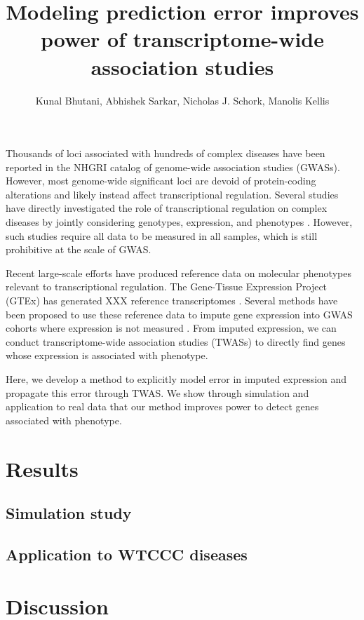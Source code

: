 \documentclass[11pt]{article}
\author{Kunal Bhutani, Abhishek Sarkar, Nicholas J. Schork, Manolis Kellis}
\date{}
\title{Modeling prediction error improves power of transcriptome-wide association studies}
\begin{document}
\maketitle
Thousands of loci associated with hundreds of complex diseases have been
reported in the NHGRI catalog of genome-wide association studies
\cite{10.1093/nar/gkt1229} (GWASs). However, most genome-wide significant loci
are devoid of protein-coding alterations \cite{10.1073/pnas.0903103106} and
likely instead affect transcriptional regulation. Several studies have directly
investigated the role of transcriptional regulation on complex diseases by
jointly considering genotypes, expression, and phenotypes \cite{xxx}. However,
such studies require all data to be measured in all samples, which is still
prohibitive at the scale of GWAS.

Recent large-scale efforts have produced reference data on molecular phenotypes
relevant to transcriptional regulation. The Gene-Tissue Expression Project
(GTEx) has generated XXX reference transcriptomes
\cite{10.1126/science.1262110}. Several methods have been proposed to use these
reference data to impute gene expression into GWAS cohorts where expression is
not measured \cite{10.1038/ng.3367,10.1101/024083}. From imputed expression, we
can conduct transcriptome-wide association studies (TWASs) to directly find
genes whose expression is associated with phenotype.

Here, we develop a method to explicitly model error in imputed expression and
propagate this error through TWAS. We show through simulation and application
to real data that our method improves power to detect genes associated with
phenotype.

\section{Results}

\subsection{Simulation study}

\subsection{Application to WTCCC diseases}

\section{Discussion}
\end{document}
